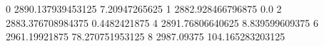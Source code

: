 0 2890.137939453125 7.20947265625
1 2882.928466796875 0.0
2 2883.376708984375 0.4482421875
4 2891.76806640625 8.839599609375
6 2961.19921875 78.270751953125
8 2987.09375 104.165283203125
